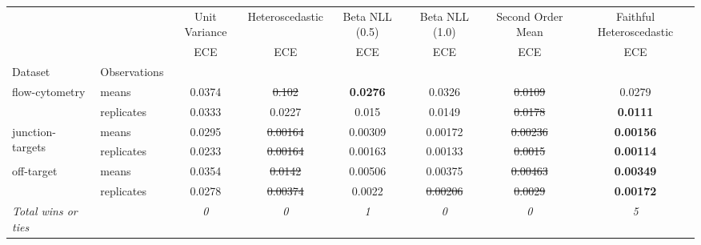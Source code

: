 \begin{tabular}{ll|c|c|c|c|c|c}
\toprule
{} & {} & {Unit Variance} & {Heteroscedastic} & {Beta NLL (0.5)} & {Beta NLL (1.0)} & {Second Order Mean} & {Faithful Heteroscedastic} \\
{} & {} & {ECE} & {ECE} & {ECE} & {ECE} & {ECE} & {ECE} \\
{Dataset} & {Observations} & {} & {} & {} & {} & {} & {} \\
\midrule
\multirow[t]{2}{*}{flow-cytometry} & means & 0.0374 & \sout{0.102} & \textbf{0.0276} & 0.0326 & \sout{0.0109} & 0.0279 \\
 & replicates & 0.0333 & 0.0227 & 0.015 & 0.0149 & \sout{0.0178} & \textbf{0.0111} \\
\multirow[t]{2}{*}{junction-targets} & means & 0.0295 & \sout{0.00164} & 0.00309 & 0.00172 & \sout{0.00236} & \textbf{0.00156} \\
 & replicates & 0.0233 & \sout{0.00164} & 0.00163 & 0.00133 & \sout{0.0015} & \textbf{0.00114} \\
\multirow[t]{2}{*}{off-target} & means & 0.0354 & \sout{0.0142} & 0.00506 & 0.00375 & \sout{0.00463} & \textbf{0.00349} \\
 & replicates & 0.0278 & \sout{0.00374} & 0.0022 & \sout{0.00206} & \sout{0.0029} & \textbf{0.00172} \\
\textit{{Total wins or ties}} &  & \textit{0} & \textit{0} & \textit{1} & \textit{0} & \textit{0} & \textit{5} \\
\bottomrule
\end{tabular}
